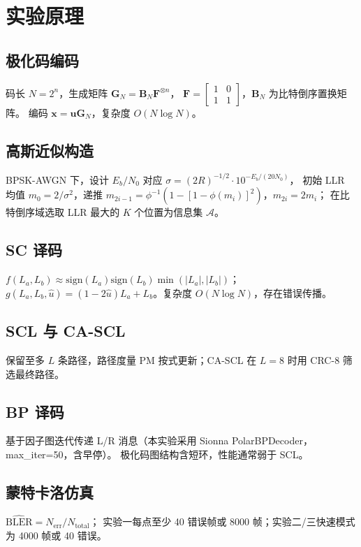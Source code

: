 \documentclass[12pt, a4paper]{article}
\newcommand{\bs}[1]{\boldsymbol{#1}}
\begin{document}
\section{实验原理}

\subsection{极化码编码}
码长 $N=2^n$，生成矩阵 $\bs{G}_N = \bs{B}_N \bs{F}^{\otimes n}$，
$\bs{F}=\begin{bmatrix}1&0\\1&1\end{bmatrix}$，$\bs{B}_N$ 为比特倒序置换矩阵。
编码 $\bs{x}=\bs{u}\bs{G}_N$，复杂度 $O(N\log N)$。

\subsection{高斯近似构造}
BPSK-AWGN 下，设计 $E_b/N_0$ 对应 $\sigma = (2R)^{-1/2}\cdot 10^{-E_b/(20N_0)}$，
初始 LLR 均值 $m_0=2/\sigma^2$，递推
$m_{2i-1}=\phi^{-1}(1-[1-\phi(m_i)]^2)$，$m_{2i}=2m_i$；
在比特倒序域选取 LLR 最大的 $K$ 个位置为信息集 $\mathcal{A}$。

\subsection{SC 译码}
$f(L_a,L_b)\approx\mathrm{sign}(L_a)\mathrm{sign}(L_b)\min(|L_a|,|L_b|)$；
$g(L_a,L_b,\hat{u})=(1-2\hat{u})L_a+L_b$。复杂度 $O(N\log N)$，存在错误传播。

\subsection{SCL 与 CA-SCL}
保留至多 $L$ 条路径，路径度量 PM 按式更新；CA-SCL 在 $L=8$ 时用 CRC-8 筛选最终路径。

\subsection{BP 译码}
基于因子图迭代传递 L/R 消息（本实验采用 Sionna PolarBPDecoder，max\_iter=50，含早停）。
极化码图结构含短环，性能通常弱于 SCL。

\subsection{蒙特卡洛仿真}
$\widehat{\mathrm{BLER}}=N_{\mathrm{err}}/N_{\mathrm{total}}$；
实验一每点至少 40 错误帧或 8000 帧；实验二/三快速模式为 4000 帧或 40 错误。
\end{document}
